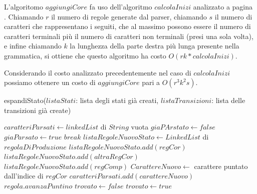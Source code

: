 \documentclass[12pt]{article}
\begin{document}
L'algoritomo $aggiungiCore$ fa uso dell'algoritmo $calcolaInizi$ analizzato a pagina \pageref{COSTOINIZI}. Chiamando $r$ il numero di regole generate dal parser, chiamando $s$ il numero di caratteri che rappresentano i seguiti, che al massimo possono essere il numero di caratteri terminali più il numero di caratteri non terminali (presi una sola volta), e infine chiamando $k$ la lunghezza della parte destra più lunga presente nella grammatica, si ottiene che questo algoritmo ha costo $O(rk*calcolaInizi)$.\par
Considerando il costo analizzato precedentemente nel caso di $calcolaInizi$ possiamo ottenere un costo di $aggiungiCore$ pari a $O(r^3k^2s)$.

\begin{algorithm}[H]
\caption{espandiStato($listaStati$: lista degli stati già creati, $listaTransizioni$: lista delle transizioni già create)}
\label{espandiStato}
\begin{algorithmic}[1]
\State $caratteriParsati \gets linkedList$ di $String$ vuota
\State $giaPArstato \gets false$
\State $giaParsato \gets true$
\State $break$
\EndIf
\EndFor
{} 
\State $listaRegoleNuovoStato \gets LinkedList$ di $regolaDiProduzione$ 
\State $listaRegoleNuovoStato.add(regCor)$
\State $listaRegoleNuovoStato.add(altraRegCor)$ 
\EndIf
\EndFor
{}
\State $listaRegoleNuovoStato.add(regComp)$
\EndIf
\EndFor
\EndIf
\State $CarattereNuovo \gets$ carattere puntato dall'indice di $regCor$
\State $caratteriParsati.add(carattereNuovo)$
\State $regola.avanzaPuntino$ 
\EndFor
\State $trovato \gets false$
\State $trovato \gets true$
\EndIf
\EndFor
{}
\end{algorithmic}
\end{algorithm}
\end{document}
